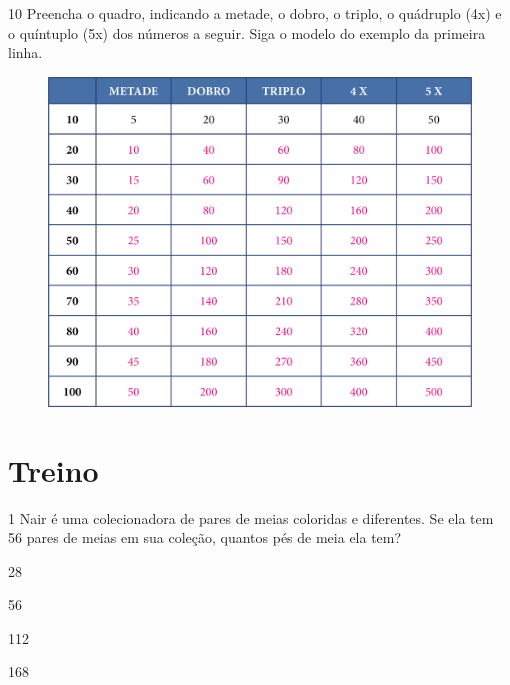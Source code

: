 \pagebreak
\num{10} Preencha o quadro, indicando a metade, o dobro, o triplo, o quádruplo
(4x) e o quíntuplo (5x) dos números a seguir. Siga o modelo do exemplo da
primeira linha.

\begin{figure}[htpb!]
\includegraphics[width=\textwidth]{./media/image111.png}
\end{figure}


\pagebreak
\section*{Treino}

\num{1} Nair é uma colecionadora de pares de meias coloridas e diferentes. Se
ela tem 56 pares de meias em sua coleção, quantos pés de meia ela tem?

\begin{escolha}[itemsep=-5pt]
\item 28

\item 56

\item 112

\item 168
\end{escolha}

